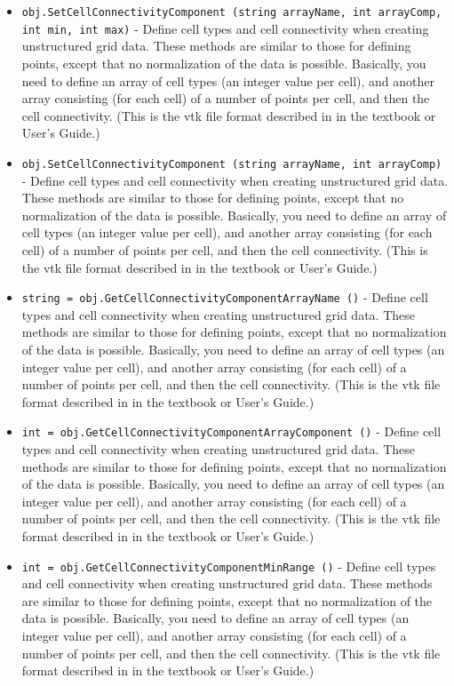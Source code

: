 \begin{itemize}
\item  \verb|obj.SetCellConnectivityComponent (string arrayName, int arrayComp, int min, int max)| -  Define cell types and cell connectivity when creating unstructured grid
 data.  These methods are similar to those for defining points, except
 that no normalization of the data is possible. Basically, you need to
 define an array of cell types (an integer value per cell), and another
 array consisting (for each cell) of a number of points per cell, and
 then the cell connectivity. (This is the vtk file format described in 
 in the textbook or User's Guide.)

\item  \verb|obj.SetCellConnectivityComponent (string arrayName, int arrayComp)| -  Define cell types and cell connectivity when creating unstructured grid
 data.  These methods are similar to those for defining points, except
 that no normalization of the data is possible. Basically, you need to
 define an array of cell types (an integer value per cell), and another
 array consisting (for each cell) of a number of points per cell, and
 then the cell connectivity. (This is the vtk file format described in 
 in the textbook or User's Guide.)

\item  \verb|string = obj.GetCellConnectivityComponentArrayName ()| -  Define cell types and cell connectivity when creating unstructured grid
 data.  These methods are similar to those for defining points, except
 that no normalization of the data is possible. Basically, you need to
 define an array of cell types (an integer value per cell), and another
 array consisting (for each cell) of a number of points per cell, and
 then the cell connectivity. (This is the vtk file format described in 
 in the textbook or User's Guide.)

\item  \verb|int = obj.GetCellConnectivityComponentArrayComponent ()| -  Define cell types and cell connectivity when creating unstructured grid
 data.  These methods are similar to those for defining points, except
 that no normalization of the data is possible. Basically, you need to
 define an array of cell types (an integer value per cell), and another
 array consisting (for each cell) of a number of points per cell, and
 then the cell connectivity. (This is the vtk file format described in 
 in the textbook or User's Guide.)

\item  \verb|int = obj.GetCellConnectivityComponentMinRange ()| -  Define cell types and cell connectivity when creating unstructured grid
 data.  These methods are similar to those for defining points, except
 that no normalization of the data is possible. Basically, you need to
 define an array of cell types (an integer value per cell), and another
 array consisting (for each cell) of a number of points per cell, and
 then the cell connectivity. (This is the vtk file format described in 
 in the textbook or User's Guide.)


\end{itemize}
